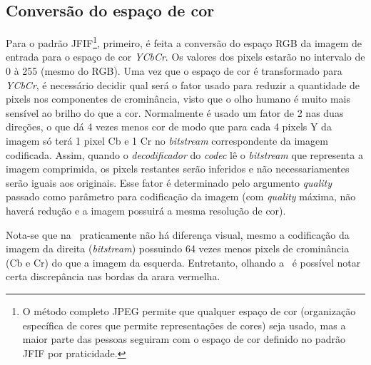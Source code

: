 \subsection{Conversão do espaço de cor}
Para o padrão \acrshort{JFIF}\footnote{O método completo JPEG permite que qualquer espaço de cor (organização específica de cores que permite representações de cores) seja usado, mas a maior parte das pessoas seguiram com o espaço de cor definido no padrão \acrshort{JFIF} por praticidade.}, primeiro, é feita a conversão do espaço RGB da imagem de entrada para o espaço de cor \textit{YCbCr}. Os valores dos pixels estarão no intervalo de 0 à 255 (mesmo do RGB).
Uma vez que o espaço de cor é transformado para \textit{YCbCr}, é necessário decidir qual será o fator usado para reduzir a quantidade de pixels nos componentes de crominância, visto que o olho humano é muito mais sensível ao brilho do que a cor. Normalmente é usado um fator de 2 nas duas direções, o que dá 4 vezes menos cor de modo que para cada 4 pixels Y da imagem só terá 1 pixel Cb e 1 Cr no \textit{bitstream} correspondente da imagem codificada. Assim, quando o \textit{decodificador} do \textit{codec} lê o \textit{bitstream} que representa a imagem comprimida, os pixels restantes serão inferidos e não necessariamentes serão iguais aos originais. Esse fator é determinado pelo argumento \textit{quality} passado como parâmetro para codificação da imagem (com \textit{quality} máxima, não haverá redução e a imagem possuirá a mesma resolução de cor).

Nota-se que na~ praticamente não há diferença visual, mesmo a codificação da imagem da direita (\textit{bitstream}) possuindo 64 vezes menos pixels de crominância (Cb e Cr) do que a imagem da esquerda. Entretanto, olhando a~ é possível notar certa discrepância nas bordas da arara vermelha.


